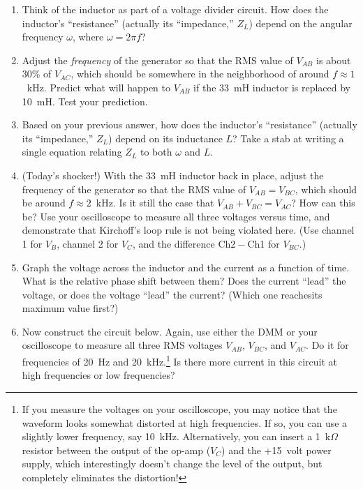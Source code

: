 \begin{enumerate}[wide]
\item Think of the inductor as part of a voltage divider circuit.  How does the inductor's ``resistance'' (actually its ``impedance,'' $Z_L$) depend on the angular frequency $\omega$, where $\omega = 2 \pi f$?

\item Adjust the \textit{frequency} of the generator so that the RMS value of $V_{AB}$ is about 30\% of $V_{AC}$, which should be somewhere in the neighborhood of around $f \approx 1$~kHz.  Predict what will happen to $V_{AB}$ if the 33~mH inductor is replaced by 10~mH.  Test your prediction.

\item Based on your previous answer, how does the inductor's ``resistance'' (actually its ``impedance,''  $Z_L$) depend on its inductance $L$?  Take a stab at writing a single equation relating $Z_L$ to both $\omega$ and $L$.

\item (Today's shocker!) With the 33~mH inductor back in place, adjust the frequency of the generator so that the RMS value of $V_{AB} = V_{BC}$, which should be around $f \approx 2$~kHz.   Is it still the case that $V_{AB} + V_{BC} = V_{AC}$?  How can this be?  Use your oscilloscope to measure all three voltages versus time, and demonstrate that Kirchoff's loop rule is not being violated here.  (Use channel 1 for $V_B$, channel 2 for $V_C$, and the difference Ch$2- $Ch1 for $V_{BC}$.)

\item Graph the voltage across the inductor and the current as a function of time.  What is the relative phase shift between them?  Does the current ``lead'' the voltage, or does the voltage ``lead'' the current? (Which one reachesits maximum value first?) \label{part_RL_graphs}

\newpage

\item Now construct the circuit below. Again, use either the DMM or your oscilloscope to measure all three RMS voltages  $V_{AB}$,  $V_{BC}$, and $V_{AC}$.   Do it for frequencies of 20~Hz and 20~kHz.\footnote{If you measure the voltages on your oscilloscope, you may notice that the waveform looks somewhat distorted at high frequencies.  If so, you can use a slightly lower frequency, say 10~kHz.  Alternatively, you can insert a 1~k$\Omega$ resistor between the output of the op-amp ($V_C$) and the +15~volt power supply, which interestingly doesn't change the level of the output, but completely eliminates the distortion!}  Is there more current in this circuit at high frequencies or low frequencies?


\end{enumerate}
